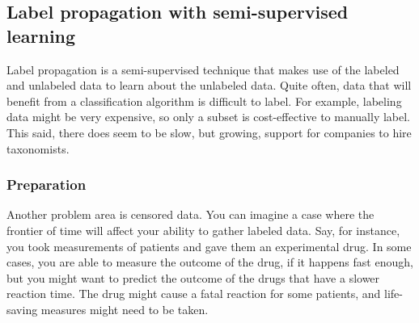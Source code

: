 \documentclass[SKL-MASTER.tex]{subfiles}
\begin{document}
\subsection{Label propagation with semi-supervised
learning}
Label propagation is a semi-supervised technique that makes use of the labeled and
unlabeled data to learn about the unlabeled data. Quite often, data that will benefit from
a classification algorithm is difficult to label. For example, labeling data might be very
expensive, so only a subset is cost-effective to manually label. This said, there does
seem to be slow, but growing, support for companies to hire taxonomists.
\subsubsection{Preparation}
Another problem area is censored data. You can imagine a case where the frontier of time
will affect your ability to gather labeled data. Say, for instance, you took measurements of
patients and gave them an experimental drug. In some cases, you are able to measure the
outcome of the drug, if it happens fast enough, but you might want to predict the outcome
of the drugs that have a slower reaction time. The drug might cause a fatal reaction for
some patients, and life-saving measures might need to be taken.
\end{document}
